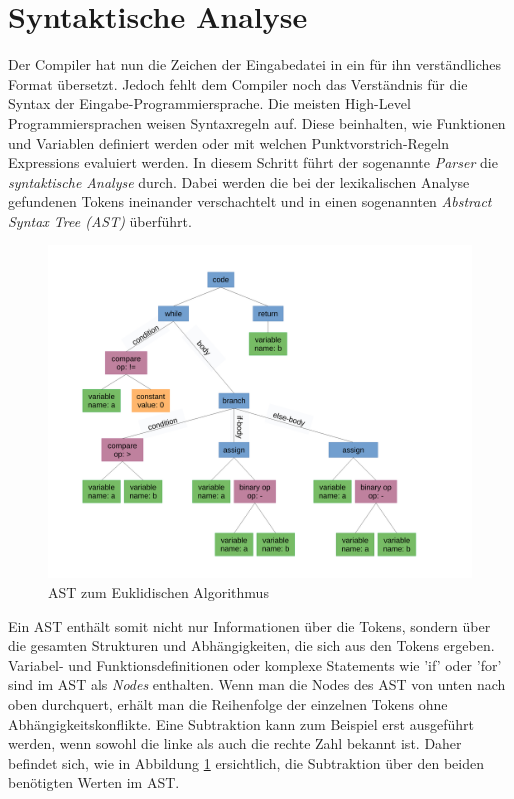 \section{Syntaktische Analyse}
Der Compiler hat nun die Zeichen der Eingabedatei in ein für ihn verständliches Format übersetzt.
Jedoch fehlt dem Compiler noch das Verständnis für die Syntax der Eingabe-Programmiersprache.
Die meisten High-Level Programmiersprachen weisen Syntaxregeln auf. Diese beinhalten, wie Funktionen und Variablen definiert werden oder mit welchen Punktvorstrich-Regeln Expressions evaluiert werden.
In diesem Schritt führt der sogenannte \textit{Parser} die \textit{syntaktische Analyse} durch.
Dabei werden die bei der lexikalischen Analyse gefundenen Tokens ineinander verschachtelt und in einen sogenannten \textit{Abstract Syntax Tree (AST)} überführt.

\begin{figure}[H]
    \centering
    \includegraphics[scale=0.4]{resources/images/AST.pdf}
    \caption[AST zum Euklidischen Algorithmus. (https://en.wikipedia.org/wiki/Abstract\_syntax\_tree, besucht am 5.8.2024)]{AST zum Euklidischen Algorithmus}
    \label{fig:syntax-tree}
\end{figure}

Ein AST enthält somit nicht nur Informationen über die Tokens, sondern über die gesamten Strukturen und Abhängigkeiten, die sich aus den Tokens ergeben. Variabel- und Funktionsdefinitionen oder komplexe Statements wie 'if' oder 'for'
sind im AST als \textit{Nodes} enthalten. Wenn man die Nodes des AST von unten nach oben durchquert, erhält man die Reihenfolge der einzelnen Tokens ohne Abhängigkeitskonflikte.
Eine Subtraktion kann zum Beispiel erst ausgeführt werden, wenn sowohl die linke als auch die rechte Zahl bekannt ist.
Daher befindet sich, wie in Abbildung \ref{fig:syntax-tree} ersichtlich, die Subtraktion über den beiden benötigten Werten im AST.

